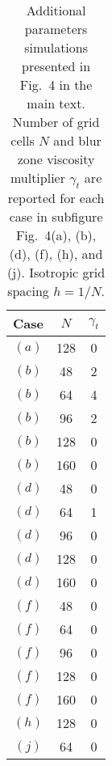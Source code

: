 \documentclass[times, 10pt]{article}
\begin{document}
   	        \begin{table}\centering
                \caption{Additional parameters simulations presented in Fig.~4 in the main text. Number of grid cells $N$ and blur zone viscosity multiplier $\gamma_t$ are reported for each case in subfigure Fig.~4(a), (b), (d), (f), (h), and (j). Isotropic grid spacing $h=1/N$.}
                \label{table:lid_params}
                \begin{tabular} { c || c | c }
                    \hline
                    Case       	& $N$ & $\gamma_t$ \\ \hline
                    $(a)$	& 128 &	0	\\ \hline
                    \hline
                    $(b)$	& 48        &	2	\\ \hline
                    $(b)$	& 64        &	4	\\ \hline
                    $(b)$	& 96        &	2	 \\ \hline
                    $(b)$	& 128       &	0	 \\ \hline
                    $(b)$	& 160       &	0	 \\ \hline
                    \hline
                    $(d)$	& 48        &	0	\\ \hline
                    $(d)$	& 64        &	1	\\ \hline
                    $(d)$	& 96        &	0	 \\ \hline
                    $(d)$	& 128       &	0	 \\ \hline
                    $(d)$	& 160       &	0	 \\ \hline
                    \hline
                    $(f)$	& 48        &	0	\\ \hline
                    $(f)$	& 64        &	0	\\ \hline
                    $(f)$	& 96        &	0	 \\ \hline
                    $(f)$	& 128       &	0	 \\ \hline
                    $(f)$	& 160       &	0	 \\ \hline
                    \hline
                    $(h)$	& 128       &	0	 \\ \hline
                    \hline
                    $(j)$	& 64        &	0	 \\ \hline
                    \hline
                 \end{tabular}
            \end{table}
\end{document}
